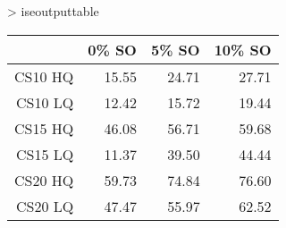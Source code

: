 > iseoutputtable
\begin{table}[ht]
\begin{center}
\begin{tabular}{rrrr}
  \hline
 & 0\% SO & 5\% SO & 10\% SO \\
  \hline
CS10 HQ & 15.55 & 24.71 & 27.71 \\
  CS10 LQ & 12.42 & 15.72 & 19.44 \\
  CS15 HQ & 46.08 & 56.71 & 59.68 \\
  CS15 LQ & 11.37 & 39.50 & 44.44 \\
  CS20 HQ & 59.73 & 74.84 & 76.60 \\
  CS20 LQ & 47.47 & 55.97 & 62.52 \\
   \hline
\end{tabular}
\end{center}
\end{table}

